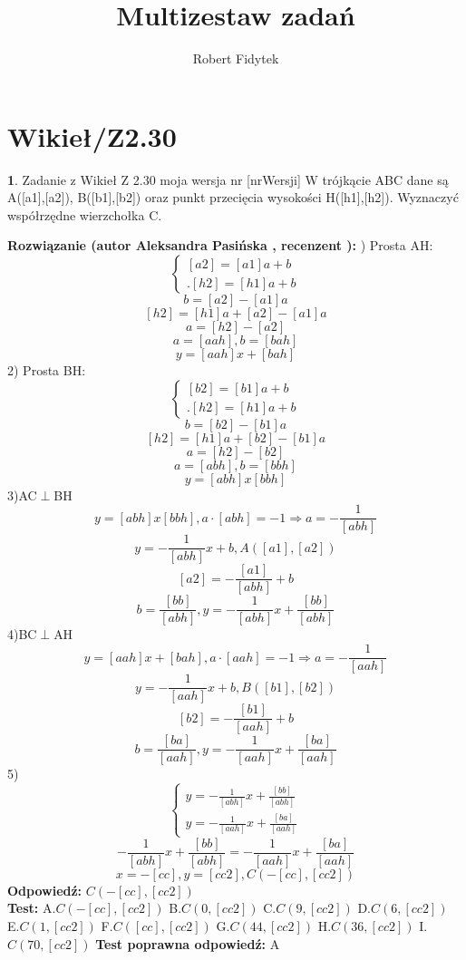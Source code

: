 \documentclass[12pt, a4paper]{article}
\title{Multizestaw zadań}
\author{Robert Fidytek}
\date{}
\theoremstyle{definition} %
\newtheorem{zad}{}
\newcommand{\kategoria}[1]{\section{#1}} %
\newcommand{\zadStart}[1]{\begin{zad}#1\newline} %
\newcommand{\zadStop}{\end{zad}}   %
\newcommand{\rozwStart}[2]{\noindent \textbf{Rozwiązanie (autor #1 , recenzent #2): }\newline} %
\newcommand{\rozwStop}{\newline}                                            %
\newcommand{\odpStart}{\noindent \textbf{Odpowiedź:}\newline}    %
\newcommand{\odpStop}{\newline}                                             %
\newcommand{\testStart}{\noindent \textbf{Test:}\newline} %
\newcommand{\testStop}{\newline} %
\newcommand{\kluczStart}{\noindent \textbf{Test poprawna odpowiedź:}\newline} %
\newcommand{\kluczStop}{\newline} %
\begin{document}
\maketitle


\kategoria{Wikieł/Z2.30}
\zadStart{Zadanie z Wikieł Z 2.30 moja wersja nr [nrWersji]}
W trójkącie ABC dane są A([a1],[a2]), B([b1],[b2]) oraz punkt przecięcia wysokości H([h1],[h2]). Wyznaczyć współrzędne wierzchołka C.
\zadStop
\rozwStart{Aleksandra Pasińska}{}
1) Prosta AH:
$$\left\{ \begin{array}{ll}
[a2]=[a1]a+b\\ 
.[h2]=[h1]a+b 
\end{array} \right.$$
$$b=[a2]-[a1]a$$
$$[h2]=[h1]a+[a2]-[a1]a$$
$$a=[h2]-[a2]$$
$$a=[aah], b=[bah]$$
$$y=[aah]x+[bah]$$
2) Prosta BH:
$$\left\{ \begin{array}{ll}
[b2]=[b1]a+b\\ 
.[h2]=[h1]a+b 
\end{array} \right.$$
$$b=[b2]-[b1]a$$
$$[h2]=[h1]a+[b2]-[b1]a$$
$$a=[h2]-[b2]$$
$$a=[abh], b=[bbh]$$
$$y=[abh]x[bbh]$$
3)AC$\perp$BH
$$y=[abh]x[bbh],a\cdot [abh]=-1\Rightarrow a=-\frac{1}{[abh]}$$
$$y=-\frac{1}{[abh]}x+b, A([a1],[a2])$$
$$[a2]=-\frac{[a1]}{[abh]}+b$$
$$b=\frac{[bb]}{[abh]},y=-\frac{1}{[abh]}x+\frac{[bb]}{[abh]}$$
4)BC$\perp$AH
$$y=[aah]x+[bah],a\cdot [aah]=-1\Rightarrow a=-\frac{1}{[aah]}$$
$$y=-\frac{1}{[aah]}x+b, B([b1],[b2])$$
$$[b2]=-\frac{[b1]}{[aah]}+b$$
$$b=\frac{[ba]}{[aah]},y=-\frac{1}{[aah]}x+\frac{[ba]}{[aah]}$$
5) $$\left\{ \begin{array}{ll}
y=-\frac{1}{[abh]}x+\frac{[bb]}{[abh]}\\ 
y=-\frac{1}{[aah]}x+\frac{[ba]}{[aah]}
\end{array} \right.$$
$$-\frac{1}{[abh]}x+\frac{[bb]}{[abh]}=-\frac{1}{[aah]}x+\frac{[ba]}{[aah]}$$
$$x=-[cc], y=[cc2], C(-[cc],[cc2])$$
\rozwStop
\odpStart
$C(-[cc],[cc2])$\\
\odpStop
\testStart
A.$ C(-[cc],[cc2])$
B.$ C(0,[cc2])$
C.$ C(9,[cc2])$
D.$ C(6,[cc2])$
E.$ C(1,[cc2])$
F.$ C([cc],[cc2])$
G.$ C(44,[cc2])$
H.$ C(36,[cc2])$
I.$ C(70,[cc2])$
\testStop
\kluczStart
A
\kluczStop
\end{document}
